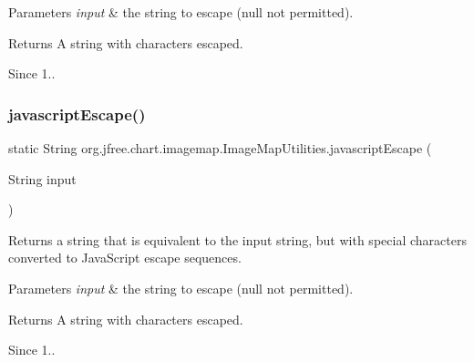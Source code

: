 \begin{DoxyParams}{Parameters}
{\em input} & the string to escape ({\ttfamily null} not permitted).\\
\hline
\end{DoxyParams}
\begin{DoxyReturn}{Returns}
A string with characters escaped.
\end{DoxyReturn}
\begin{DoxySince}{Since}
1.. 
\end{DoxySince}
\mbox{\label{classorg_1_1jfree_1_1chart_1_1imagemap_1_1_image_map_utilities_a809a6e13de23654665fa36f1a7a62e06}} 
\subsubsection{\texorpdfstring{javascript\+Escape()}{javascriptEscape()}}
{\footnotesize\ttfamily static String org.\+jfree.\+chart.\+imagemap.\+Image\+Map\+Utilities.\+javascript\+Escape (\begin{DoxyParamCaption}\item[{String}]{input }\end{DoxyParamCaption})\hspace{0.3cm}{\ttfamily [static]}}

Returns a string that is equivalent to the input string, but with special characters converted to Java\+Script escape sequences.


\begin{DoxyParams}{Parameters}
{\em input} & the string to escape ({\ttfamily null} not permitted).\\
\hline
\end{DoxyParams}
\begin{DoxyReturn}{Returns}
A string with characters escaped.
\end{DoxyReturn}
\begin{DoxySince}{Since}
1.. 
\end{DoxySince}
\mbox{\label{classorg_1_1jfree_1_1chart_1_1imagemap_1_1_image_map_utilities_a490345f58ad0c3f9284eeff1437c0d91}} 
